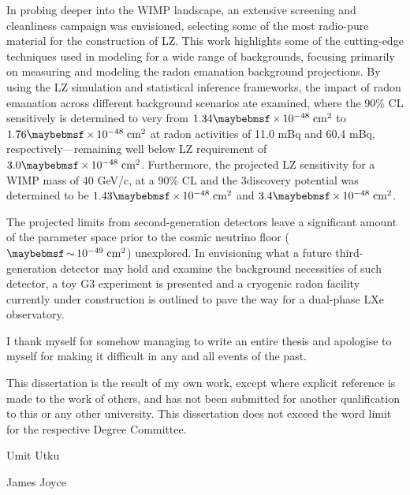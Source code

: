In probing deeper into the WIMP landscape, an extensive screening and cleanliness campaign was envisioned, selecting some of the most radio-pure material for the construction of LZ. This work highlights some of the cutting-edge techniques used in modeling for a wide range of backgrounds, focusing primarily on measuring and modeling the radon emanation background projections. By using the LZ simulation and statistical inference frameworks, the impact of radon emanation across different background scenarios ate examined, where the 90\% CL sensitively is determined to very from $1.34\times10^{-48} \; \MathText{cm}^{2}$ to $1.76\times10^{-48} \; \MathText{cm}^{2}$ at radon activities of 11.0 mBq and 60.4 mBq, respectively---remaining well below LZ requirement of $3.0\times10^{-48} \; \MathText{cm}^{2}$. Furthermore, the projected LZ sensitivity for a WIMP mass of 40 GeV/c\squared{}, at a 90\% CL and the 3\sigma discovery potential was determined to be $1.43\times10^{-48} \; \MathText{cm}^{2}$ and $3.4\times10^{-48} \; \MathText{cm}^{2}$.

The projected limits from second-generation detectors leave a significant amount of the parameter space prior to the cosmic neutrino floor ($\sim10^{-49} \; \MathText{cm}^{2}$) unexplored. In envisioning what a future third-generation detector may hold and examine the background necessities of such detector, a toy G3 experiment is presented and a cryogenic radon facility currently under construction is outlined to pave the way for a dual-phase LXe observatory.


\begin{acknowledgements}

I thank myself for somehow managing to write an entire thesis and apologise to myself for making it difficult in any and all events of the past.

\end{acknowledgements}


\begin{declaration}
  This dissertation is the result of my own work, except where explicit
  reference is made to the work of others, and has not been submitted
  for another qualification to this or any other university. This
  dissertation does not exceed the word limit for the respective Degree
  Committee.
  \vspace*{1cm}
  \begin{flushright}
    Umit Utku
  \end{flushright}
\end{declaration}

\tableofcontents

\listoffigures
\listoftables

%
  {James Joyce}
\thispagestyle{empty}
